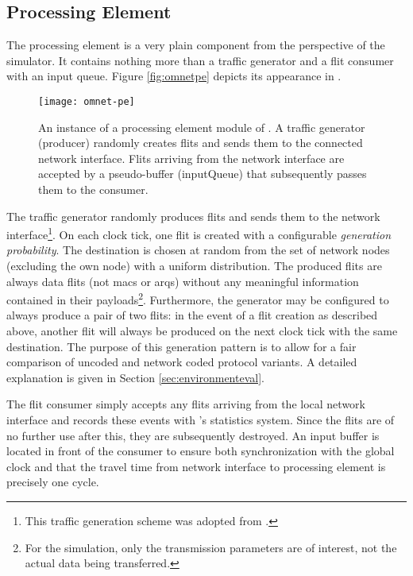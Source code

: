 \subsection{Processing Element}
The processing element is a very plain component from the perspective of the simulator. It contains nothing more than a traffic generator and a flit
consumer with an input queue. Figure \vref{fig:omnetpe} depicts its appearance in \omnet{}.

\begin{figure}
    \centering
    \texttt{[image: omnet-pe]}
    \caption[Simulator view of a processing element]{An instance of a processing element module of \omnet{}. A traffic generator (producer) randomly
    creates flits and sends them to the connected network interface. Flits arriving from the network interface are accepted by a pseudo-buffer
    (inputQueue) that subsequently passes them to the consumer.}
    \label{fig:omnetpe}
\end{figure}

The traffic generator randomly produces flits and sends them to the network interface\footnote{This traffic generation scheme was adopted from
\citeauthor{moriam18activeattackers} \cite{moriam18activeattackers}.}. On each clock tick, one flit is created with a configurable
\textit{generation probability}. The destination is chosen at random from the set of network nodes (excluding the own node) with a uniform
distribution. The produced flits are always data flits (not \glspl{mac} or \glspl{arq}) without any meaningful information contained in their
payloads\footnote{For the simulation, only the transmission parameters are of interest, not the actual data being transferred.}. Furthermore, the
generator may be configured to always produce a pair of two flits: in the event of a flit creation as described above, another flit will always be
produced on the next clock tick with the same destination. The purpose of this generation pattern is to allow for a fair comparison of uncoded and
network coded protocol variants. A detailed explanation is given in Section \ref{sec:environmenteval}.

The flit consumer simply accepts any flits arriving from the local network interface and records these events with \omnet{}'s statistics system. Since
the flits are of no further use after this, they are subsequently destroyed. An input buffer is located in front of the consumer to ensure both
synchronization with the global clock and that the travel time from network interface to processing element is precisely one cycle.

